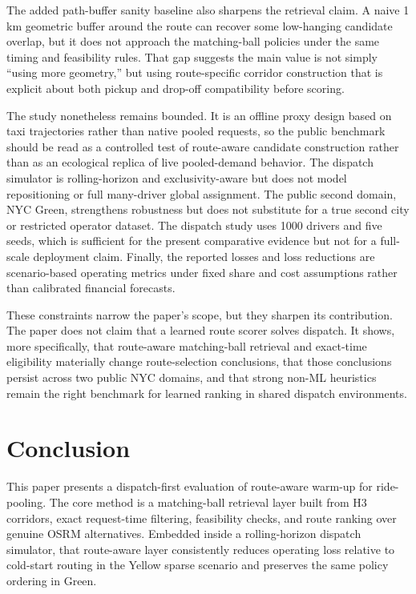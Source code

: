 \documentclass[journal]{IEEEtran}
\begin{document}
The added path-buffer sanity baseline also sharpens the retrieval claim. A naive 1 km geometric buffer around the route can recover some low-hanging candidate overlap, but it does not approach the matching-ball policies under the same timing and feasibility rules. That gap suggests the main value is not simply ``using more geometry,'' but using route-specific corridor construction that is explicit about both pickup and drop-off compatibility before scoring.

The study nonetheless remains bounded. It is an offline proxy design based on taxi trajectories rather than native pooled requests, so the public benchmark should be read as a controlled test of route-aware candidate construction rather than as an ecological replica of live pooled-demand behavior. The dispatch simulator is rolling-horizon and exclusivity-aware but does not model repositioning or full many-driver global assignment. The public second domain, NYC Green, strengthens robustness but does not substitute for a true second city or restricted operator dataset. The dispatch study uses 1000 drivers and five seeds, which is sufficient for the present comparative evidence but not for a full-scale deployment claim. Finally, the reported losses and loss reductions are scenario-based operating metrics under fixed share and cost assumptions rather than calibrated financial forecasts.

These constraints narrow the paper's scope, but they sharpen its contribution. The paper does not claim that a learned route scorer solves dispatch. It shows, more specifically, that route-aware matching-ball retrieval and exact-time eligibility materially change route-selection conclusions, that those conclusions persist across two public NYC domains, and that strong non-ML heuristics remain the right benchmark for learned ranking in shared dispatch environments.

\section{Conclusion}
This paper presents a dispatch-first evaluation of route-aware warm-up for ride-pooling. The core method is a matching-ball retrieval layer built from H3 corridors, exact request-time filtering, feasibility checks, and route ranking over genuine OSRM alternatives. Embedded inside a rolling-horizon dispatch simulator, that route-aware layer consistently reduces operating loss relative to cold-start routing in the Yellow sparse scenario and preserves the same policy ordering in Green.
\end{document}
